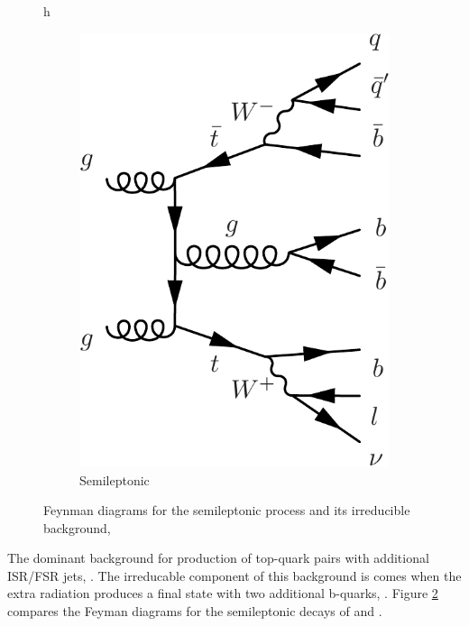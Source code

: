\begin{figure}{h}
\begin{subfigure}[h]{0.4\textwidth}
        \includegraphics[width=\textwidth]{Figures/Feynman_Diagrams/backgrounds__ttbar_plus_bbar_semileptonic.pdf}
        \caption{Semileptonic \ttbb}\label{fig:higgs_production_vbf}
      \end{subfigure}
      \caption{Feynman diagrams for the semileptonic \ttH process and
        its irreducible background, \ttbb } \label{fig:feynman_diagrams__tth_vs_ttbb_semilep}
\end{figure}

\par The dominant background for \ttH production of top-quark pairs
with additional ISR/FSR jets, \ttjets.  The irreducable component of
this background is comes when the extra radiation produces a final
state with two additional b-quarks, \ttbb.  Figure
\ref{fig:feynman_diagrams__tth_vs_ttbb_semilep} compares the Feyman
diagrams for the semileptonic decays of \ttH and \ttbb.  

